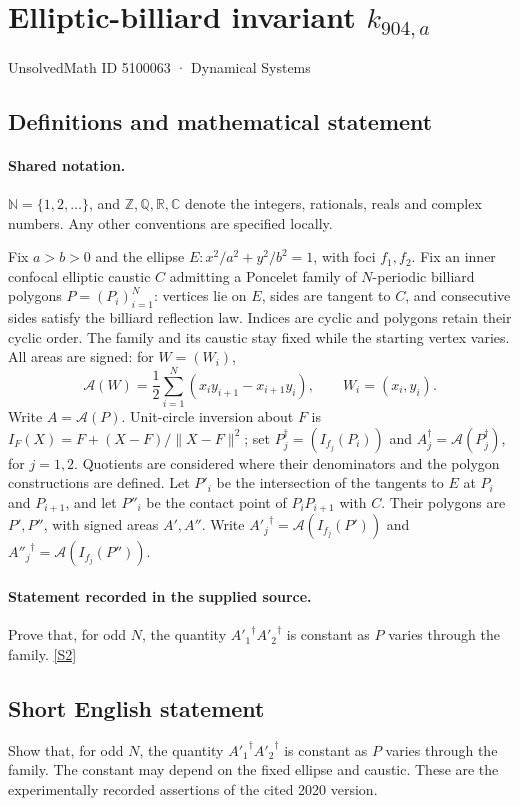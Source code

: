 \documentclass[11pt]{article}
\newcommand{\sref}[2]{\hyperlink{source:#1:#2}{[S#2]}}
\begin{document}
\setcounter{section}{5100062}
\section{Elliptic-billiard invariant $k_{904,a}$}\label{5100063}
{\small\sffamily UnsolvedMath ID 5100063 · Dynamical Systems}
\subsection{Definitions and mathematical statement}

\paragraph{Shared notation.}$\mathbb N=\{1,2,\ldots\}$, and $\mathbb Z,\mathbb Q,\mathbb R,\mathbb C$ denote the integers, rationals, reals and complex numbers. Any other conventions are specified locally.


Fix $a>b>0$ and the ellipse $E:x^2/a^2+y^2/b^2=1$, with foci $f_1,f_2$. Fix an inner confocal elliptic caustic $C$ admitting a Poncelet family of $N$-periodic billiard polygons $P=(P_i)_{i=1}^N$: vertices lie on $E$, sides are tangent to $C$, and consecutive sides satisfy the billiard reflection law. Indices are cyclic and polygons retain their cyclic order. The family and its caustic stay fixed while the starting vertex varies. All areas are signed: for $W=(W_i)$,
\[\mathcal A(W)=\frac12\sum_{i=1}^N(x_i y_{i+1}-x_{i+1}y_i),\qquad W_i=(x_i,y_i).\]
Write $A=\mathcal A(P)$. Unit-circle inversion about $F$ is $I_F(X)=F+(X-F)/\lVert X-F\rVert^2$; set $P_j^\dagger=(I_{f_j}(P_i))$ and $A_j^\dagger=\mathcal A(P_j^\dagger)$, for $j=1,2$. Quotients are considered where their denominators and the polygon constructions are defined. Let $P'_i$ be the intersection of the tangents to $E$ at $P_i$ and $P_{i+1}$, and let $P''_i$ be the contact point of $P_iP_{i+1}$ with $C$. Their polygons are $P',P''$, with signed areas $A',A''$. Write ${A'_j}^\dagger=\mathcal A(I_{f_j}(P'))$ and ${A''_j}^\dagger=\mathcal A(I_{f_j}(P''))$.
\paragraph{Statement recorded in the supplied source.}
Prove that, for odd $N$, the quantity ${A'_1}^\dagger{A'_2}^\dagger$ is constant as $P$ varies through the family. \sref{5100063}{2}
\subsection{Short English statement}
Show that, for odd $N$, the quantity ${A'_1}^\dagger{A'_2}^\dagger$ is constant as $P$ varies through the family. The constant may depend on the fixed ellipse and caustic. These are the experimentally recorded assertions of the cited 2020 version.
\end{document}

